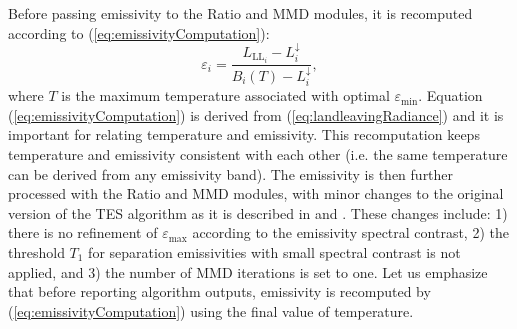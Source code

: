 Before passing emissivity to the Ratio and MMD modules, it is  {recomputed} according to (\ref{eq:emissivityComputation}):
\begin{equation}
\varepsilon_{ {i}} = \frac{L_{\mathrm{LL}_{ {i}}} - L^\downarrow_{ {i}}}{B_{ {i}}(T) - L^\downarrow_{ {i}}},
\label{eq:emissivityComputation}
\end{equation}
where $T$ is the maximum temperature associated with optimal $\varepsilon_\mathrm{min}$.  {Equation (\ref{eq:emissivityComputation}) is derived from (\ref{eq:landleavingRadiance}) and it is important for relating temperature and emissivity. This recomputation keeps temperature and emissivity consistent with each other (i.e. the same temperature can be derived from any emissivity band).} The emissivity is then further processed with the Ratio and MMD modules, with minor changes to  {the} original version of the TES algorithm as it is described in \cite{GR98} and \cite{GR99}. These changes include: 1) there is no refinement of $\varepsilon_\mathrm{max}$ according to the emissivity spectral contrast, 2) the threshold $T_1$ for separation emissivities with small spectral contrast is not applied, and 3) the number of MMD iterations is set to one. Let us emphasize that before  
reporting algorithm outputs, emissivity is  {recomputed} by (\ref{eq:emissivityComputation}) using the final value of temperature.





